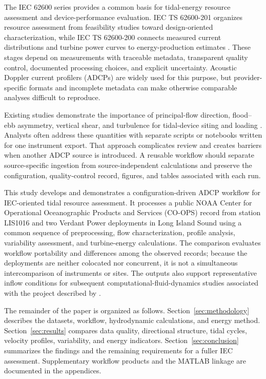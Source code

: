 \documentclass[12pt,sort&compress]{elsarticle}
\begin{document}
The IEC 62600 series provides a common basis for tidal-energy resource assessment and device-performance evaluation. IEC TS 62600-201 organizes resource assessment from feasibility studies toward design-oriented characterization, while IEC TS 62600-200 connects measured current distributions and turbine power curves to energy-production estimates \cite{noauthor_iec_nodate}. These stages depend on measurements with traceable metadata, transparent quality control, documented processing choices, and explicit uncertainty. Acoustic Doppler current profilers (ADCPs) are widely used for this purpose, but provider-specific formats and incomplete metadata can make otherwise comparable analyses difficult to reproduce.

Existing studies demonstrate the importance of principal-flow direction, flood--ebb asymmetry, vertical shear, and turbulence for tidal-device siting and loading \cite{kilcher_tidal_2023,neill_review_2021,sellar_characterisation_2018}. Analysts often address these quantities with separate scripts or notebooks written for one instrument export. That approach complicates review and creates barriers when another ADCP source is introduced. A reusable workflow should separate source-specific ingestion from source-independent calculations and preserve the configuration, quality-control record, figures, and tables associated with each run.

This study develops and demonstrates a configuration-driven ADCP workflow for IEC-oriented tidal resource assessment. It processes a public NOAA Center for Operational Oceanographic Products and Services (CO-OPS) record from station LIS1016 and two Verdant Power deployments in Long Island Sound using a common sequence of preprocessing, flow characterization, profile analysis, variability assessment, and turbine-energy calculations. The comparison evaluates workflow portability and differences among the observed records; because the deployments are neither colocated nor concurrent, it is not a simultaneous intercomparison of instruments or sites. The outputs also support representative inflow conditions for subsequent computational-fluid-dynamics studies associated with the project described by \citet{husoVP2026}.

The remainder of the paper is organized as follows. Section~\ref{sec:methodology} describes the datasets, workflow, hydrodynamic calculations, and energy method. Section~\ref{sec:results} compares data quality, directional structure, tidal cycles, velocity profiles, variability, and energy indicators. Section~\ref{sec:conclusion} summarizes the findings and the remaining requirements for a fuller IEC assessment. Supplementary workflow products and the MATLAB linkage are documented in the appendices.
\end{document}
